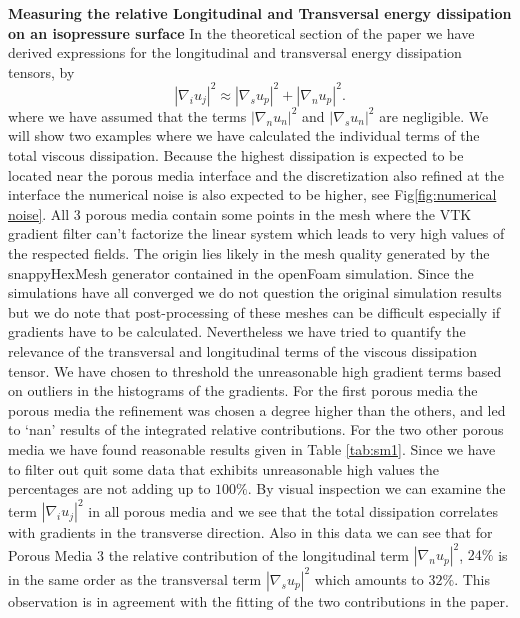 \documentclass[draft,jgrga]{agutexSI2019}
\begin{document}
\begin{article}
\noindent\textbf{Measuring the relative Longitudinal and Transversal energy dissipation on an isopressure surface} 
In the theoretical section of the paper we have derived expressions for the longitudinal and transversal energy dissipation tensors, by 
\begin{equation}\label{eq:reduced_dissipation_tensor}
\left|\nabla_i u_j\right|^2 \approx  \left|\nabla_s u_p\right|^2 + \left|\nabla_n u_p\right|^2 .
\end{equation}
where we have assumed that the terms $ \left|\nabla_n u_n\right|^2$ and $ \left|\nabla_s u_n\right|^2$ are negligible. We will show two examples where we have calculated the individual terms of the total viscous dissipation. Because the highest dissipation is expected to be located near the porous media interface and the discretization also refined at the interface the numerical noise is also expected to be higher, see Fig\ref{fig:numerical noise}. All 3 porous media contain some points in the mesh where the VTK gradient filter can't factorize the linear system which leads to very high values of the respected fields. The origin lies likely in the mesh quality generated by the snappyHexMesh generator contained in the openFoam simulation. Since the simulations have all converged we do not question the original simulation results but we do note that post-processing of these meshes can be difficult especially if gradients have to be calculated. Nevertheless we have tried to quantify the relevance of the transversal and longitudinal terms of the viscous dissipation tensor. We have chosen to threshold the unreasonable high gradient terms based on outliers in the histograms of the gradients. For the first porous media the porous media the refinement was chosen a degree higher than the others, and led to `nan' results of the integrated relative contributions. For the two other porous media we have found reasonable results given in Table \ref{tab:sm1}. Since we have to filter out quit some data that exhibits unreasonable high values the percentages are not adding up to $100\%$. By visual inspection we can examine the term $\left|\nabla_i u_j\right|^2$ in all porous media and we see that the total dissipation correlates with gradients in the transverse direction. Also in this data we can see that for Porous Media 3 the relative contribution of the longitudinal term $ \left|\nabla_n u_p\right|^2$, $24\%$ is in the same order as the transversal term $ \left|\nabla_s u_p\right|^2$ which amounts to $32\%$. This observation is in agreement with the fitting of the two contributions in the paper.


\end{article}
\end{document}
